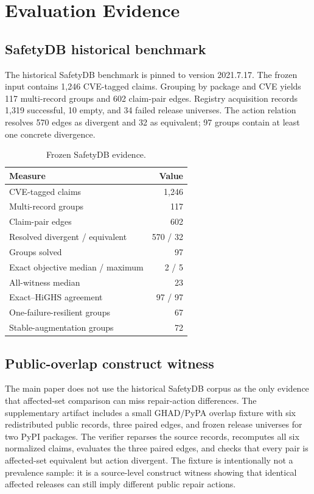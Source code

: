 \documentclass[10pt,conference]{IEEEtran}
\newcommand{\suppTableFont}{\footnotesize}
\begin{document}
\section{Evaluation Evidence}
\subsection{SafetyDB historical benchmark}
The historical SafetyDB benchmark is pinned to version 2021.7.17. The frozen input contains 1,246 CVE-tagged claims. Grouping by package and CVE yields 117 multi-record groups and 602 claim-pair edges. Registry acquisition records 1,319 successful, 10 empty, and 34 failed release universes. The action relation resolves 570 edges as divergent and 32 as equivalent; 97 groups contain at least one concrete divergence.

\begin{table}[t]
\centering
\caption{Frozen SafetyDB evidence.}
\suppTableFont
\begin{tabular}{lr}
\toprule
Measure & Value \\
\midrule
CVE-tagged claims & 1,246 \\
Multi-record groups & 117 \\
Claim-pair edges & 602 \\
Resolved divergent / equivalent & 570 / 32 \\
Groups solved & 97 \\
Exact objective median / maximum & 2 / 5 \\
All-witness median & 23 \\
Exact--HiGHS agreement & 97 / 97 \\
One-failure-resilient groups & 67 \\
Stable-augmentation groups & 72 \\
\bottomrule
\end{tabular}
\end{table}

\subsection{Public-overlap construct witness}
The main paper does not use the historical SafetyDB corpus as the only evidence that affected-set comparison can miss repair-action differences. The supplementary artifact includes a small GHAD/PyPA overlap fixture with six redistributed public records, three paired edges, and frozen release universes for two PyPI packages. The verifier reparses the source records, recomputes all six normalized claims, evaluates the three paired edges, and checks that every pair is affected-set equivalent but action divergent. The fixture is intentionally not a prevalence sample: it is a source-level construct witness showing that identical affected releases can still imply different public repair actions.
\end{document}
